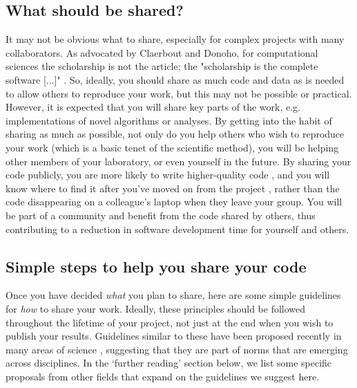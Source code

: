 \documentclass[11pt]{article}
\begin{document}
\subsection*{What should be shared?}

It may not be obvious what to share, especially for complex projects
with many collaborators.  As advocated by Claerbout and Donoho, for
computational sciences the scholarship is not the article; the
"scholarship is the complete software [...]"
\cite{claerbout_electronic_1992,donoho_invitation_2010}.  So, ideally,
you should share as much code and data as is needed to allow others to reproduce
your work, but this may not be possible or practical.  However, it is
expected that you will share key parts of the work,
e.g. implementations of novel algorithms or analyses.  By getting into
the habit of sharing as much as possible, not only do you help others
who wish to reproduce your work (which is a basic tenet of the scientific 
method), you will be helping other members of
your laboratory, or even yourself in the future.  By sharing your code
publicly, you are more likely to write higher-quality code
\cite{Easterbrook2014}, and you will know where to find it after
you've moved on from the project \cite{Halchenko2015}, rather than the
code disappearing on a colleague's laptop when they leave your group.
You will be part of a community and benefit from the code shared by
others, thus contributing to a reduction in software development time
for yourself and others.

\subsection*{Simple steps to help you share your code}

Once you have decided \textit{what} you plan to share, here are some simple 
guidelines for \textit{how} to share your work.  Ideally, these
principles should be followed throughout the lifetime of your project,
not just at the end when you wish to publish your results. Guidelines similar to these have been proposed recently in many areas of science \cite{Nosek2015, miguel2014, stodden2012journals}, suggesting that they are part of norms that are emerging across disciplines. In the `further reading' section below, we list some specific proposals from other fields that expand on the guidelines we suggest here.  
\end{document}
